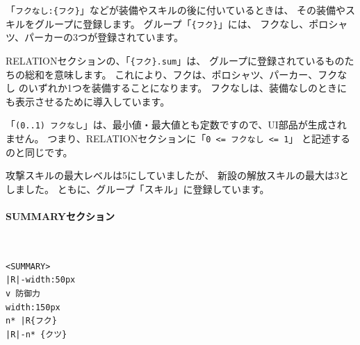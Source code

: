 \documentclass[dvipdfmx]{jsarticle}
\begin{document}
「\texttt{フクなし:\{フク\}}」などが装備やスキルの後に付いているときは、
その装備やスキルをグループに登録します。
グループ「\texttt{\{フク\}}」には、
フクなし、ポロシャツ、パーカーの3つが登録されています。

RELATIONセクションの、「\texttt{\{フク\}.sum}」は、
グループに登録されているものたちの総和を意味します。
これにより、フクは、ポロシャツ、パーカー、フクなし
のいずれか1つを装備することになります。
フクなしは、装備なしのときにも表示させるために導入しています。

「\texttt{(0..1) フクなし}」は、最小値・最大値とも定数ですので、UI部品が生成されません。
つまり、RELATIONセクションに「\texttt{0 <= フクなし <= 1}」
と記述するのと同じです。

攻撃スキルの最大レベルは5にしていましたが、
新設の解放スキルの最大は3としました。
ともに、グループ「スキル」に登録しています。

\begin{center}
\end{center}
\begin{center}
\end{center}

\paragraph{SUMMARYセクション}~\medskip
{\footnotesize\begin{mdframed}\begin{Verbatim}[commandchars=|<>]
<SUMMARY>
|R|-width:50px
v 防御力
width:150px
n* |R{フク}
|R|-n* {クツ}
\end{Verbatim}
\end{mdframed}}
\medskip
\end{document}
